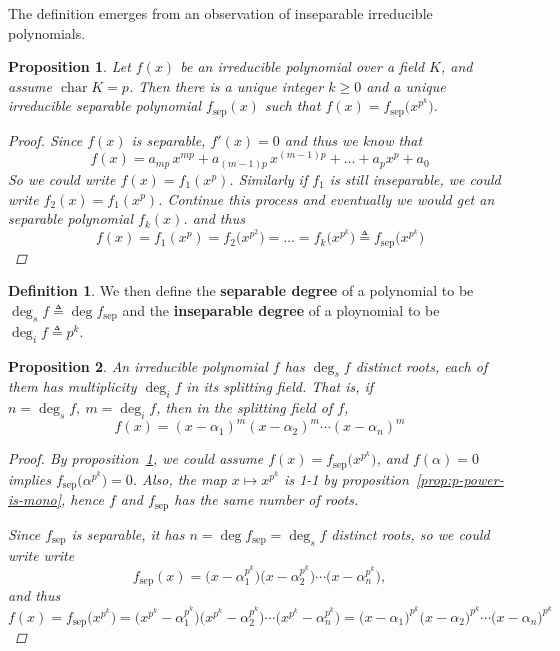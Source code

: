 \documentclass[a4paper]{article}
\newcommand{\defeq}{\triangleq}
\DeclareMathOperator{\Char}{char}
\theoremstyle{remark}
\theoremstyle{definition}
\theoremstyle{definition}
\newtheorem{definition}{Definition}
\theoremstyle{plain}
\newtheorem{proposition}{Proposition}
\begin{document}
  The definition emerges from an observation of inseparable irreducible polynomials.

  \begin{proposition} \label{prop:sep-polynomial}
    Let $f(x)$ be an irreducible polynomial over a field $K$, and assume $\Char K = p$.
    Then there is a unique integer $k \geq 0$ and a unique irreducible separable polynomial
    $f_{\text{sep}}(x)$ such that $f(x) = f_\text{sep}\big(x^{p^k}\big)$.

    \begin{proof}
      Since $f(x)$ is separable, $f'(x) = 0$ and thus we know that
      \[ f(x) = a_{mp} \, x^{mp}  + a_{(m-1)p} \, x^{(m-1)p} + \dots + a_p x^p + a_0 \]
      So we could write $f(x) = f_1(x^p)$. Similarly if $f_1$ is still inseparable, we could
      write $f_2(x) = f_1(x^p)$. Continue this process and eventually we would get an separable
      polynomial $f_k(x)$. and thus
      \[ f(x) = f_1(x^p) = f_2 \big( x^{p^2} \big) = \dots
        = f_k \big( x^{p^k} \big) \defeq f_\text{sep}\big( x^{p^k} \big) \]
    \end{proof}
  \end{proposition}

  \begin{definition}
    We then define the {\bf separable degree} of a polynomial to be $\deg_s f \defeq \deg f_\text{sep}$ and
    the {\bf inseparable degree} of a ploynomial to be $\deg_i f \defeq p^k$.
  \end{definition}

  \begin{proposition} \label{prop:multiplicity-insep}
    An irreducible polynomial $f$ has $\deg_s f$ distinct roots, each of them has multiplicity $\deg_i f$
    in its splitting field.
    That is, if $n = \deg_s f,\  m = \deg_i f$, then in the splitting field of $f$,
    \[ f(x) = (x - \alpha_1)^m (x - \alpha_2)^m \dotsm (x - \alpha_n)^m \]

    \begin{proof}
      By proposition~\ref{prop:sep-polynomial}, we could assume $f(x) = f_\text{sep}\big(x^{p^k}\big)$,
      and $f(\alpha) = 0$ implies $f_\text{sep}\big(\alpha^{p^k}\big) = 0$. Also, the map $x \mapsto x^{p^k}$
      is 1-1 by proposition~\ref{prop:p-power-is-mono}, hence $f$ and $f_\text{sep}$ has the same number of
      roots.

      Since $f_\text{sep}$ is separable, it has $n = \deg f_\text{sep} = \deg_s f$
      distinct roots, so we could write write
      \[ f_\text{sep}(x) =
        \big(x - \alpha_1^{p^k}\big) \big(x - \alpha_2^{p^k}\big) \dotsm \big(x - \alpha_n^{p^k}\big), \]
      and thus
      \[ f(x) = f_\text{sep}\big( x^{p^k} \big) =
        \Big(x^{p^k} - \alpha_1^{p^k}\Big) \Big(x^{p^k} - \alpha_2^{p^k}\Big) \dotsm \Big(x^{p^k}- \alpha_n^{p^k}\Big)
        = \big(x - \alpha_1\big)^{p^k} \big(x - \alpha_2\big)^{p^k} \dotsm \big(x - \alpha_n\big)^{p^k} \]

    \end{proof}
  \end{proposition}
\end{document}
